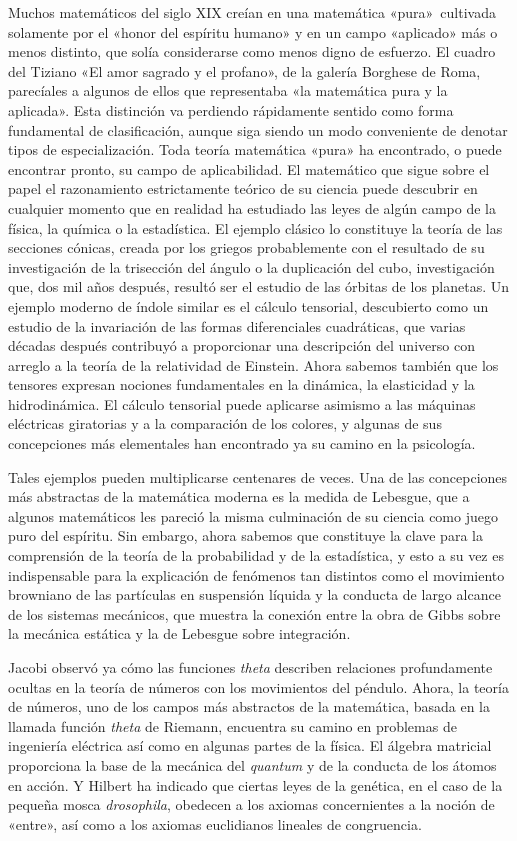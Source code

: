 \documentclass[a4paper, 12pt]{article}
\begin{document}
{{Muchos matemáticos del siglo XIX creían en una matemática «pura»\ cultivada
solamente por el «honor del espíritu humano» y en un campo «aplicado» más o
menos distinto, que solía considerarse como menos digno de esfuerzo. El cuadro
del Tiziano «El amor sagrado y el profano», de la galería Borghese de Roma,
parecíales a algunos de ellos que representaba «la matemática pura y la
aplicada». Esta distinción va perdiendo rápidamente sentido como forma
fundamental de clasificación, aunque siga siendo un modo conveniente de denotar
tipos de especialización. Toda teoría matemática «pura»  ha encontrado, o puede
encontrar pronto, su campo de aplicabilidad. El matemático que sigue sobre el
papel el razonamiento estrictamente teórico de su ciencia puede descubrir en
cualquier momento que en realidad ha estudiado las leyes de algún campo de la
física, la química o la estadística. El ejemplo clásico lo constituye la teoría
de las secciones cónicas, creada por los griegos probablemente con el resultado
de su investigación de la trisección del ángulo o la duplicación del cubo,
investigación que, dos mil años después, resultó ser el estudio de las órbitas
de los planetas. Un ejemplo moderno de índole similar es el cálculo tensorial,
descubierto como un estudio de la invariación de las formas diferenciales
cuadráticas, que varias décadas después contribuyó a proporcionar una
descripción del universo con arreglo a la teoría de la relatividad de Einstein.
Ahora sabemos también que los tensores expresan nociones fundamentales en la
dinámica, la elasticidad y la hidrodinámica. El cálculo tensorial puede
aplicarse asimismo a las máquinas eléctricas giratorias y a la comparación de
los colores, y algunas de sus concepciones más elementales han encontrado ya su
camino en la psicología.

Tales ejemplos pueden multiplicarse centenares de veces. Una de las concepciones
más abstractas de la matemática moderna es la medida de Lebesgue, que a algunos
matemáticos les pareció la misma culminación de su ciencia como juego puro del
espíritu. Sin embargo, ahora sabemos que constituye la clave para la comprensión
de la teoría de la probabilidad y de la estadística, y esto a su vez es
indispensable para la explicación de fenómenos tan distintos como el movimiento
browniano de las partículas en suspensión líquida y la conducta de largo alcance
de los sistemas mecánicos,  que muestra la conexión entre la obra de Gibbs sobre
la mecánica estática y la de Lebesgue sobre integración.

Jacobi observó ya cómo las funciones \textit{theta} describen relaciones
profundamente ocultas en la teoría de números con los movimientos del péndulo.
Ahora, la teoría de números, uno de los campos más abstractos de la matemática,
basada en la llamada función \textit{theta} de Riemann, encuentra su camino en
problemas de ingeniería eléctrica así como en algunas partes de la física. El
álgebra matricial proporciona la base de la mecánica del \textit{quantum} y de
la conducta de los átomos en acción. Y Hilbert ha indicado que ciertas leyes de
la genética, en el caso de la pequeña mosca \textit{drosophila}, obedecen a los
axiomas concernientes a la noción de «entre», así como a los axiomas euclidianos
lineales de congruencia.

}}
\end{document}
